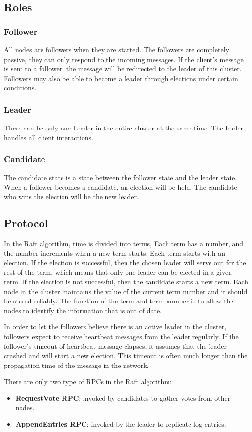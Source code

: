 \documentclass[12pt, a4paper]{article}
\begin{document}
\subsection{Roles}
  \subsubsection{Follower}
  All nodes are followers when they are started. The followers are completely passive, they can only respond to the incoming
  messages. If the client's message is sent to a follower, the message will be redirected to the leader of this cluster. Followers may
  also be able to become a leader through elections under certain conditions.
  \subsubsection{Leader}
  There can be only one Leader in the entire cluster at the same time. The leader handles all client interactions.
  \subsubsection{Candidate}
  The candidate state is a state between the follower state and the leader state. When a follower becomes a candidate, an election 
  will be held. The candidate who wins the election will be the new leader.
\subsection{Protocol}
In the Raft algorithm, time is divided into terms, Each term has a number, and the number increments when a new term starts. Each term starts
with an election. If the election is successful, then the chosen leader will serve out for the rest of the term, which means that
only one leader can be elected in a given term. If the election is not successful, then the candidate starts a new term. Each node
in the cluster maintains the value of the current term number and it should be stored reliably. The function of the term and term number is
to allow the nodes to identify the information that is out of date.
\par
In order to let the followers believe there is an active leader in the cluster, followers expect to receive heartbeat messages from
the leader regularly. If the follower's timeout of heartbeat message elapses, it assumes that the leader crashed and will start a
new election. This timeout is often much longer than the propagation time of the message in the network.
\par
There are only two type of RPCs in the Raft algorithm:
\begin{itemize}
  \item \textbf{RequestVote RPC}: invoked by candidates to gather votes from other nodes.
  \item \textbf{AppendEntries RPC}: invoked by the leader to replicate log entries.
\end{itemize}
\end{document}

